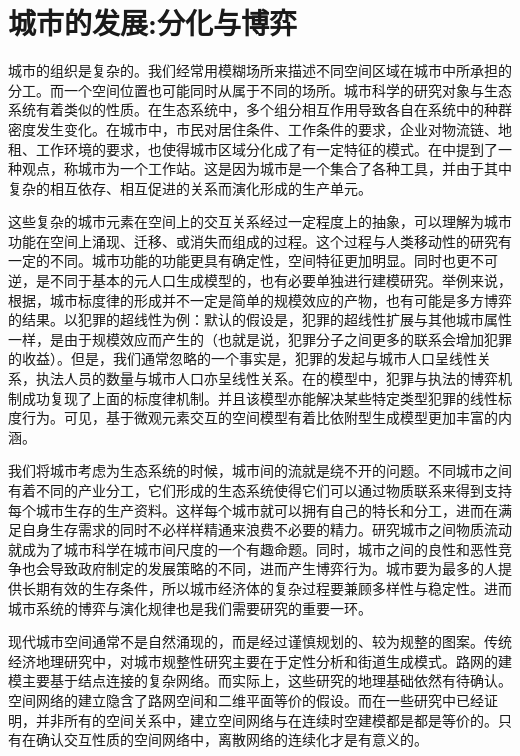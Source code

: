 \chapter{城市的发展:分化与博弈}

城市的组织是复杂的。我们经常用模糊场所来描述不同空间区域在城市中所承担的分工。而一个空间位置也可能同时从属于不同的场所。城市科学的研究对象与生态系统有着类似的性质。在生态系统中，多个组分相互作用导致各自在系统中的种群密度发生变化。在城市中，市民对居住条件、工作条件的要求，企业对物流链、地租、工作环境的要求，也使得城市区域分化成了有一定特征的模式。在\cite{christopherson1986city}中提到了一种观点，称城市为一个工作站。这是因为城市是一个集合了各种工具，并由于其中复杂的相互依存、相互促进的关系而演化形成的生产单元。

这些复杂的城市元素在空间上的交互关系经过一定程度上的抽象，可以理解为城市功能在空间上涌现、迁移、或消失而组成的过程。这个过程与人类移动性\cite{molas2017field,gonzalez2008understanding,song2010limits,song2010modelling}的研究有一定的不同。城市功能的功能更具有确定性，空间特征更加明显。同时也更不可逆，是不同于基本的元人口生成模型的，也有必要单独进行建模研究。举例来说，根据\cite{banerjee2015competitive}，城市标度律的形成并不一定是简单的规模效应的产物，也有可能是多方博弈的结果。以犯罪的超线性为例：默认的假设是，犯罪的超线性扩展与其他城市属性一样，是由于规模效应而产生的（也就是说，犯罪分子之间更多的联系会增加犯罪的收益）。但是，我们通常忽略的一个事实是，犯罪的发起与城市人口呈线性关系，执法人员的数量与城市人口亦呈线性关系。在\cite{banerjee2015competitive}的模型中，犯罪与执法的博弈机制成功复现了上面的标度律机制。并且该模型亦能解决某些特定类型犯罪的线性标度行为。可见，基于微观元素交互的空间模型有着比依附型生成模型更加丰富的内涵。

我们将城市考虑为生态系统的时候，城市间的流就是绕不开的问题。不同城市之间有着不同的产业分工，它们形成的生态系统使得它们可以通过物质联系来得到支持每个城市生存的生产资料。这样每个城市就可以拥有自己的特长和分工，进而在满足自身生存需求的同时不必样样精通来浪费不必要的精力。研究城市之间物质流动就成为了城市科学在城市间尺度的一个有趣命题。同时，城市之间的良性和恶性竞争也会导致政府制定的发展策略的不同，进而产生博弈行为。城市要为最多的人提供长期有效的生存条件，所以城市经济体的复杂过程要兼顾多样性与稳定性。进而城市系统的博弈与演化规律也是我们需要研究的重要一环。

现代城市空间通常不是自然涌现的，而是经过谨慎规划的、较为规整的图案。传统经济地理研究中，对城市规整性研究主要在于定性分析\cite{colonna2002proposal}和街道生成模式\cite{barthelemy2008modeling}。路网的建模主要基于结点连接的复杂网络。而实际上，这些研究的地理基础依然有待确认。空间网络的建立隐含了路网空间和二维平面等价的假设。而在一些研究中\cite{DURRETT1994363}已经证明，并非所有的空间关系中，建立空间网络与在连续时空建模都是都是等价的。只有在确认交互性质的空间网络中，离散网络的连续化才是有意义的。

